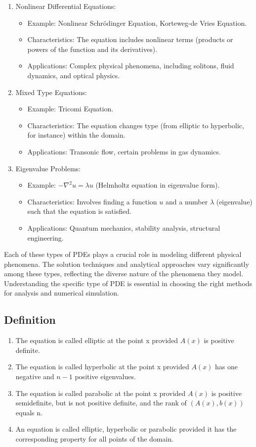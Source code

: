 \documentclass[a4paper,12pt]{article} %
\begin{document}
\begin{enumerate}
\item Nonlinear Differential Equations:
\begin{itemize}
   \item Example: Nonlinear Schrödinger Equation, Korteweg-de Vries Equation.
   \item Characteristics: The equation includes nonlinear terms (products or powers of the function and its derivatives).
   \item Applications: Complex physical phenomena, including solitons, fluid dynamics, and optical physics.
\end{itemize}

\item Mixed Type Equations:
\begin{itemize}
   \item Example: Tricomi Equation.
   \item Characteristics: The equation changes type (from elliptic to hyperbolic, for instance) within the domain.
   \item Applications: Transonic flow, certain problems in gas dynamics.
\end{itemize}

\item Eigenvalue Problems:
\begin{itemize}
   \item Example: \(-\nabla^2 u = \lambda u\) (Helmholtz equation in eigenvalue form).
   \item Characteristics: Involves finding a function \(u\) and a number \(\lambda\) (eigenvalue) such that the equation is satisfied.
   \item Applications: Quantum mechanics, stability analysis, structural engineering.
\end{itemize}

\end{enumerate}
Each of these types of PDEs plays a crucial role in modeling different physical phenomena. The solution techniques and analytical approaches vary significantly among these types, reflecting the diverse nature of the phenomena they model. Understanding the specific type of PDE is essential in choosing the right methods for analysis and numerical simulation.

\subsection{\textbf{Definition}}
\begin{enumerate}
   \item The equation is called elliptic at the point x provided
\(A(x)\) is positive definite.
   \item The equation is called hyperbolic at the point x provided \(A(x)\) has one negative and \(n - 1\) positive eigenvalues.
   \item The equation is called parabolic at the point x provided \(A(x)\) is positive semidefinite, but is not positive definite, and the rank of \((A(x), b(x))\) equals n.
   \item An equation is called elliptic, hyperbolic or parabolic provided it has the corresponding property for all points of the domain.
\end{enumerate}
\end{document}
